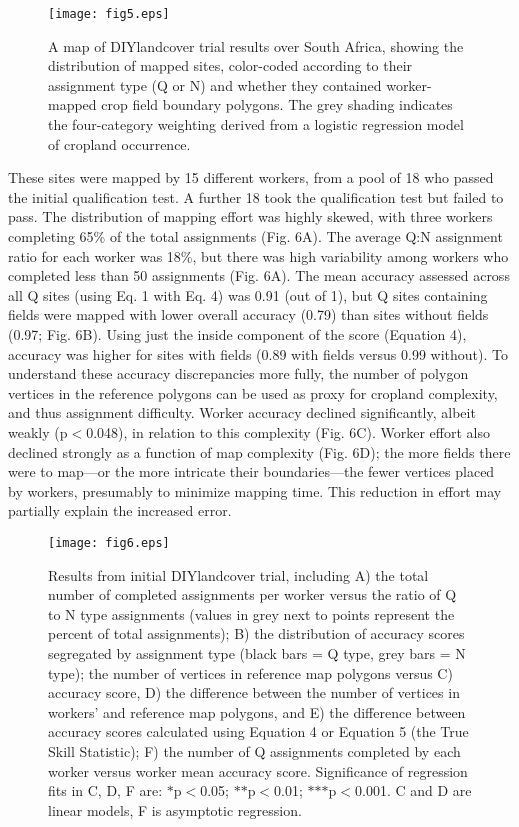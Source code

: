 \documentclass[preprint,12pt,authoryear]{elsarticle}
\begin{document}
\begin{figure}[!ht]
  \begin{center}
    \texttt{[image: fig5.eps]}
    \caption{A map of DIYlandcover trial results over South Africa, showing the distribution of mapped sites, color-coded according to their assignment type (Q or N) and whether they contained worker-mapped crop field boundary polygons. The grey shading indicates the four-category weighting derived from a logistic regression model of cropland occurrence.}
    \label{default}
  \end{center}
\end{figure}

These sites were mapped by 15 different workers, from a pool of 18 who passed the initial qualification test. A further 18 took the qualification test but failed to pass. The distribution of mapping effort was highly skewed, with three workers completing 65\% of the total assignments (Fig. 6A).  The average Q:N assignment ratio for each worker was 18\%, but there was high variability among workers who completed less than 50 assignments (Fig. 6A). The mean accuracy assessed across all Q sites (using Eq. 1 with Eq. 4) was 0.91 (out of 1), but Q sites containing fields were mapped with lower overall accuracy (0.79) than sites without fields (0.97; Fig. 6B). Using just the inside component of the score (Equation 4), accuracy was higher for sites with fields (0.89 with fields versus 0.99 without). To understand these accuracy discrepancies more fully,  the number of polygon vertices in the reference polygons can be used as proxy for cropland complexity, and thus assignment difficulty.  Worker accuracy declined significantly, albeit weakly (p$<$0.048), in relation to this complexity (Fig. 6C). Worker effort also declined strongly as a function of map complexity (Fig. 6D); the more fields there were to map---or the more intricate their boundaries---the fewer vertices placed by workers, presumably to minimize mapping time. This reduction in effort may partially explain the increased error. 

\begin{figure}[!ht]
  \begin{center}
    \texttt{[image: fig6.eps]}
    \caption{Results from initial DIYlandcover trial, including A) the total number of completed assignments per worker versus the ratio of Q to N type assignments (values in grey next to points represent the percent of total assignments); B) the distribution of accuracy scores segregated by assignment type (black bars = Q type, grey bars = N type); the number of vertices in reference map polygons versus C) accuracy score, D) the difference between the number of vertices in workers' and reference map polygons, and E) the difference between accuracy scores calculated using Equation 4 or Equation 5 (the True Skill Statistic); F) the number of Q assignments completed by each worker versus worker mean accuracy score. Significance of regression fits in C, D, F are:  $\ast$p$<$0.05; $\ast$$\ast$p$<$0.01; $\ast$$\ast$$\ast$p$<$0.001. C and D are linear models, F is asymptotic regression.} 
    \label{default}
  \end{center}
\end{figure}
\end{document}
